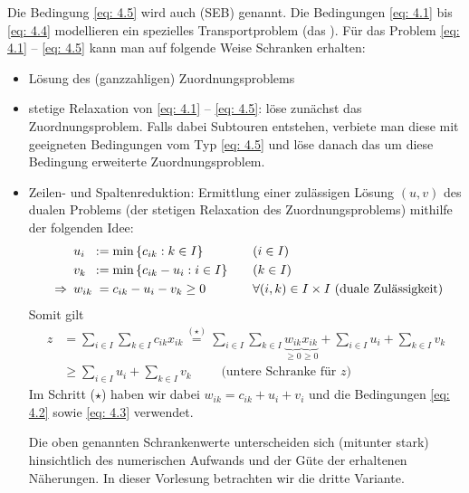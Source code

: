 Die Bedingung \eqref{eq: 4.5} wird auch  (SEB) genannt.
Die Bedingungen \eqref{eq: 4.1} bis \eqref{eq: 4.4} modellieren ein spezielles Transportproblem (das ).
Für das Problem \eqref{eq: 4.1} -- \eqref{eq: 4.5} kann man auf folgende Weise Schranken erhalten:
\begin{itemize}
	\item Lösung des (ganzzahligen) Zuordnungsproblems
	\item stetige Relaxation von \eqref{eq: 4.1} -- \eqref{eq: 4.5}: löse zunächst das Zuordnungsproblem. Falls dabei Subtouren entstehen, verbiete man diese mit geeigneten Bedingungen vom Typ \eqref{eq: 4.5} und löse danach das um diese Bedingung erweiterte Zuordnungsproblem.
	\item Zeilen- und Spaltenreduktion: Ermittlung einer zulässigen Lösung $(u,v)$ des dualen Problems (der stetigen Relaxation des Zuordnungsproblems) mithilfe der folgenden Idee:
	\begin{equation*}
		\begin{alignedat}{3}
			&u_i &&\mathrel{:=} \min\left\{ c_{ik} : k \in I \right\} \qquad &&(i \in I) \\
			&v_k &&\mathrel{:=} \min\left\{ c_{ik} - u_i : i \in I \right\} \qquad &&(k \in I) \\
			\enskip \Rightarrow \enskip &w_{ik} &&\phantom{:}= c_{ik} - u_i - v_k \ge 0 \qquad &&\forall (i,k) \in I \times I \text{ (duale Zulässigkeit)}
		\end{alignedat}
	\end{equation*}
	Somit gilt
	\begin{equation*}
		\begin{aligned}
			z &= \sum_{i \in I} \sum_{k \in I} c_{ik} x_{ik} 
			\overset{(\star)}{=} \sum_{i \in I} \sum_{k \in I} \underbrace{w_{ik}}_{\ge 0} \underbrace{x_{ik}}_{\ge 0} + \sum_{i \in I} u_i + \sum_{k \in I} v_k \\
			&\ge \sum_{i \in I} u_i + \sum_{k \in I} v_k \qquad \text{ (untere Schranke für $z$) }
		\end{aligned}
	\end{equation*}
	Im Schritt ($\star$) haben wir dabei $w_{ik} = c_{ik} + u_i + v_i$ und die Bedingungen \eqref{eq: 4.2} sowie \eqref{eq: 4.3} verwendet.
	
	Die oben genannten Schrankenwerte unterscheiden sich (mitunter stark) hinsichtlich des numerischen Aufwands und der Güte der erhaltenen Näherungen. In dieser Vorlesung betrachten wir die dritte Variante.
\end{itemize}

